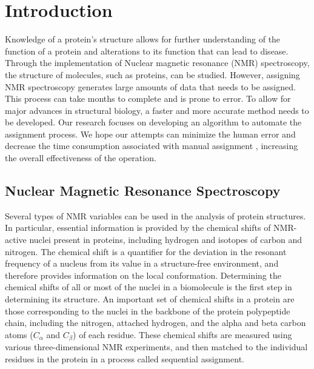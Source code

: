 \documentclass[12pt]{article}
\begin{document}
\section{Introduction}
\label{sub:introduction}
Knowledge of a protein’s structure allows for further understanding of the function of a protein and alterations to its function that can lead to disease. Through the implementation of Nuclear magnetic resonance (NMR) spectroscopy, the structure of molecules, such as proteins, can be studied. However, assigning NMR spectroscopy generates large amounts of data that needs to be assigned. This process can take months to complete and is prone to error. To allow for major advances in structural biology, a faster and more accurate method needs to be developed. Our research focuses on developing an algorithm to automate the assignment process. We hope our attempts can minimize the human error and decrease the time consumption associated with manual assignment , increasing the overall effectiveness of the operation.

\subsection{Nuclear Magnetic Resonance Spectroscopy} %
\label{sub:nmr}
Several types of NMR variables can be used in the analysis of protein structures. In particular, essential information is provided by the chemical shifts of NMR-active nuclei present in proteins, including hydrogen and isotopes of carbon and nitrogen. The chemical shift is a quantifier for the deviation in the resonant frequency of a nucleus from its value in a structure-free environment, and therefore provides information on the local conformation. Determining the chemical shifts of all or most of the nuclei in a biomolecule is the first step in determining its structure. An important set of chemical shifts in a protein are those corresponding to the nuclei in the backbone of the protein polypeptide chain, including the nitrogen, attached hydrogen, and the alpha and beta carbon atoms ($C_\alpha$ and $C_{\beta}$) of each residue. These chemical shifts are measured using various three-dimensional NMR experiments, and then matched to the individual residues in the protein in a process called sequential assignment.
\end{document}
